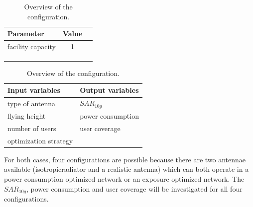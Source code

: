\begin{table}[!htb]
    \begin{minipage}{.5\linewidth}
      \centering
        \begin{tabular}{|l|c|l|}
        \hline
        \textbf{Parameter}              & \textbf{Value}          \\   \hline 
        facility capacity               & 1        \\    
        &  \\ 
        & \\ 
        & \\ 
        \hline
        \end{tabular}
    \end{minipage}%
    \begin{minipage}{.5\linewidth}
      \centering
            \begin{tabular}{|l|l|}
            \hline
            \textbf{Input variables  }              & \textbf{Output variables}          \\   \hline 
            type of antenna                & $SAR_{10g}$               \\ 
            flying height                     & power consumption             \\ 
            number of users                & user coverage            \\
            optimization strategy         &                               \\ 
            \hline
            \end{tabular}
    \end{minipage} 
        \caption{Overview of the configuration.}
        \label{table:confOverviewScenario2}
\end{table}

For both cases, four configurations are possible because there are two antennae available (\gls{isotropicradiator} and a realistic antenna) which can both operate in a power consumption optimized network or an exposure optimized 
network. The $SAR_{10g}$, power consumption and user coverage will be investigated for all four configurations.




